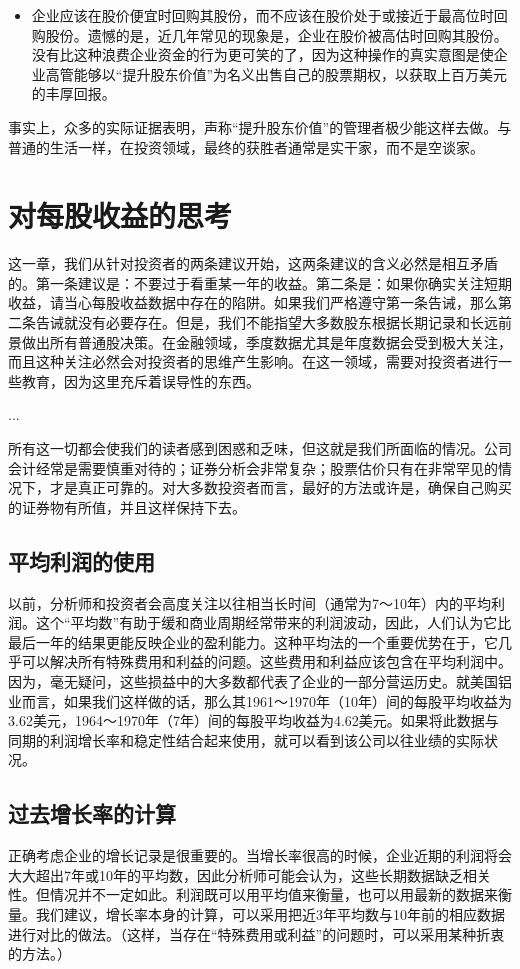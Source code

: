 \documentclass[12pt,oneside]{book}
\begin{document}
\begin{itemize}
\begin{itemize}
\item 企业应该在股价便宜时回购其股份，而不应该在股价处于或接近于最高位时回购股份。遗憾的是，近几年常见的现象是，企业在股价被高估时回购其股份。没有比这种浪费企业资金的行为更可笑的了，因为这种操作的真实意图是使企业高管能够以“提升股东价值”为名义出售自己的股票期权，以获取上百万美元的丰厚回报。
\end{itemize}

事实上，众多的实际证据表明，声称“提升股东价值”的管理者极少能这样去做。与普通的生活一样，在投资领域，最终的获胜者通常是实干家，而不是空谈家。

\end{itemize}


\section{对每股收益的思考}
这一章，我们从针对投资者的两条建议开始，这两条建议的含义必然是相互矛盾的。第一条建议是：不要过于看重某一年的收益。第二条是：如果你确实关注短期收益，请当心每股收益数据中存在的陷阱。如果我们严格遵守第一条告诫，那么第二条告诫就没有必要存在。但是，我们不能指望大多数股东根据长期记录和长远前景做出所有普通股决策。在金融领域，季度数据尤其是年度数据会受到极大关注，而且这种关注必然会对投资者的思维产生影响。在这一领域，需要对投资者进行一些教育，因为这里充斥着误导性的东西。

...


所有这一切都会使我们的读者感到困惑和乏味，但这就是我们所面临的情况。公司会计经常是需要慎重对待的；证券分析会非常复杂；股票估价只有在非常罕见的情况下，才是真正可靠的。对大多数投资者而言，最好的方法或许是，确保自己购买的证券物有所值，并且这样保持下去。

\subsection{平均利润的使用}
以前，分析师和投资者会高度关注以往相当长时间（通常为7～10年）内的平均利润。这个“平均数”有助于缓和商业周期经常带来的利润波动，因此，人们认为它比最后一年的结果更能反映企业的盈利能力。这种平均法的一个重要优势在于，它几乎可以解决所有特殊费用和利益的问题。这些费用和利益应该包含在平均利润中。因为，毫无疑问，这些损益中的大多数都代表了企业的一部分营运历史。就美国铝业而言，如果我们这样做的话，那么其1961～1970年（10年）间的每股平均收益为3.62美元，1964～1970年（7年）间的每股平均收益为4.62美元。如果将此数据与同期的利润增长率和稳定性结合起来使用，就可以看到该公司以往业绩的实际状况。

\subsection{过去增长率的计算}
正确考虑企业的增长记录是很重要的。当增长率很高的时候，企业近期的利润将会大大超出7年或10年的平均数，因此分析师可能会认为，这些长期数据缺乏相关性。但情况并不一定如此。利润既可以用平均值来衡量，也可以用最新的数据来衡量。我们建议，增长率本身的计算，可以采用把近3年平均数与10年前的相应数据进行对比的做法。（这样，当存在“特殊费用或利益”的问题时，可以采用某种折衷的方法。）
\end{document}
